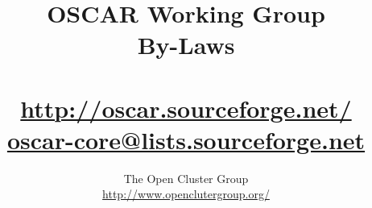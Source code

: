 %
%
%

\title{OSCAR Working Group \\
By-Laws \\
\ \\
\url{http://oscar.sourceforge.net/} \\
\href{mailto:oscar-core@lists.sourceforge.net}{oscar-core@lists.sourceforge.net}}

\author{The Open Cluster Group \\
\url{http://www.openclutergroup.org/}}
\maketitle
